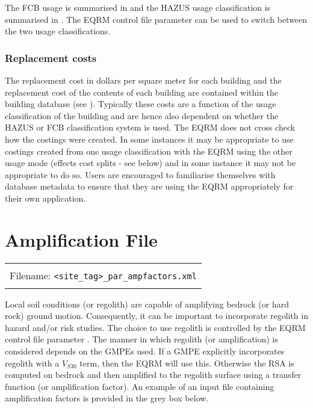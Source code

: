 The FCB usage is summarised in
 and the HAZUS usage
classification is summarised in
. The EQRM control file parameter
 can be used to switch between
the two usage classifications.


\subsubsection{Replacement costs}
\label{sec:grids-replacecosts}


The replacement cost in dollars per square meter for each building
and the replacement cost of the contents of each building are
contained within the building database
(see ).
Typically these costs are a function of the usage classification
of the building and are hence also dependent on whether the
HAZUS or FCB classification system is used. The EQRM does not cross
check how the costings were created. In some instances
it may be appropriate to use costings created from one usage
classification with the EQRM using the other usage mode (effects
cost splits - see below) and in some instance it may not be
appropriate to do so. Users are encouraged to familiarise
themselves with database metadata to ensure that they are using
the EQRM appropriately for their own application.


\clearpage

\section{Amplification File}
\label{sec:-appl-amplification}

\begin{center}
\begin{tabular}{|c|}
\hline
\\
Filename: \texttt{<site\_tag>\_par\_ampfactors.xml} \\
\\
\hline
\end{tabular}
\end{center}

Local soil conditions (or regolith) are capable of amplifying
bedrock (or hard rock) ground motion. Consequently, it can be important
to incorporate regolith in hazard and/or risk studies.
The choice to use regolith is controlled by the EQRM control
file parameter . The manner in
which regolith (or amplification) is considered depends on
the GMPEs used. If a GMPE explicitly incorporates
regolith with a $V_{S30}$ term, then the EQRM will use this.
Otherwise the RSA is computed on bedrock and then amplified
to the regolith surface using a transfer function (or amplification factor).
An example of an input file containing amplification factors is provided in the grey box below.


